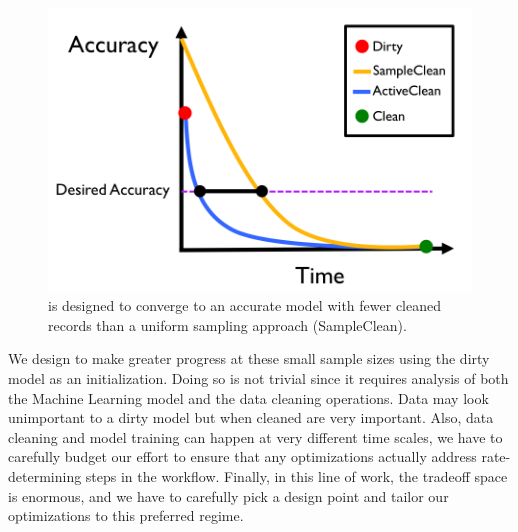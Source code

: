 \begin{figure}[t]
\centering
 \includegraphics[width=0.5\columnwidth]{figs/arch2.png}
 \caption{\sys is designed to converge to an accurate model with fewer cleaned records than a uniform sampling approach (SampleClean). \label{sys-arch2}}\vspace{-1em}
\end{figure}


We design \sys to make greater progress at these small sample sizes using the dirty model as an initialization.
Doing so is not trivial since it requires analysis of both the Machine Learning model and the data cleaning operations.
Data may look unimportant to a dirty model but when cleaned are very important.
Also, data cleaning and model training can happen at very different time scales, we have to carefully budget our effort to ensure that any optimizations actually address rate-determining steps in the workflow.
Finally, in this line of work, the tradeoff space is enormous, and we have to carefully pick a design point and tailor our optimizations to this preferred regime.
\fi



